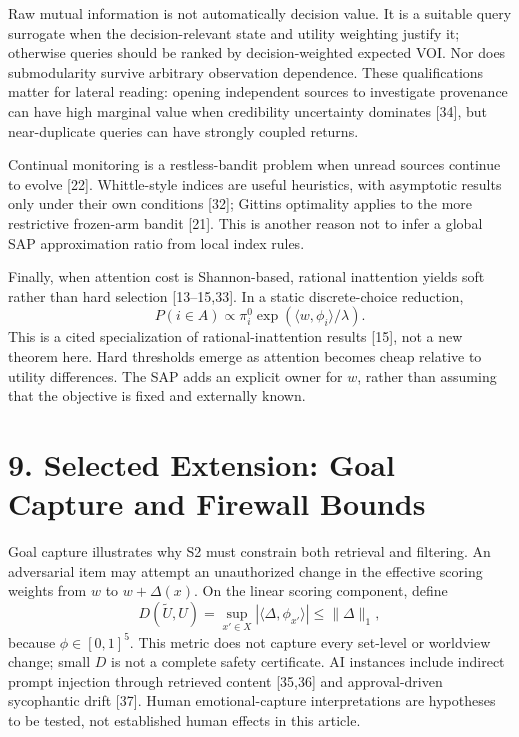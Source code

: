 \documentclass[
  11pt]{article}
\begin{document}
Raw mutual information is not automatically decision value. It is a suitable query surrogate when the decision-relevant state and utility weighting justify it; otherwise queries should be ranked by decision-weighted expected VOI. Nor does submodularity survive arbitrary observation dependence. These qualifications matter for lateral reading: opening independent sources to investigate provenance can have high marginal value when credibility uncertainty dominates {[}34{]}, but near-duplicate queries can have strongly coupled returns.

Continual monitoring is a restless-bandit problem when unread sources continue to evolve {[}22{]}. Whittle-style indices are useful heuristics, with asymptotic results only under their own conditions {[}32{]}; Gittins optimality applies to the more restrictive frozen-arm bandit {[}21{]}. This is another reason not to infer a global SAP approximation ratio from local index rules.

Finally, when attention cost is Shannon-based, rational inattention yields soft rather than hard selection {[}13--15,33{]}. In a static discrete-choice reduction, \[
P(i\in A)\propto\pi_i^0\exp(\langle w,\phi_i\rangle/\lambda).
\] This is a cited specialization of rational-inattention results {[}15{]}, not a new theorem here. Hard thresholds emerge as attention becomes cheap relative to utility differences. The SAP adds an explicit owner for \(w\), rather than assuming that the objective is fixed and externally known.

\section{9. Selected Extension: Goal Capture and Firewall Bounds}\label{selected-extension-goal-capture-and-firewall-bounds}

Goal capture illustrates why S2 must constrain both retrieval and filtering. An adversarial item may attempt an unauthorized change in the effective scoring weights from \(w\) to \(w+\Delta(x)\). On the linear scoring component, define \[
D(\widetilde U,U)=\sup_{x'\in X}|\langle\Delta,\phi_{x'}\rangle|
\leq\|\Delta\|_1,
\tag{20}
\] because \(\phi\in[0,1]^5\). This metric does not capture every set-level or worldview change; small \(D\) is not a complete safety certificate. AI instances include indirect prompt injection through retrieved content {[}35,36{]} and approval-driven sycophantic drift {[}37{]}. Human emotional-capture interpretations are hypotheses to be tested, not established human effects in this article.
\end{document}
